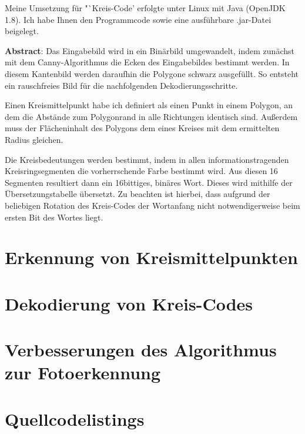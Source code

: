 \documentclass[a4paper, DIV=12, firstfoot=false, dvipsnames]{scrreprt}
\newcommand{\task}[1]{Kreis-Code}
\begin{document}
	\titlehead{Teilnahme 6745 (Team 00001) \hfill Laurenz Grote}
	\title{\task}
	\subtitle{Aufgabe 3}
	\author{Laurenz Friedrich Grote}
	\date{}
	\maketitle
	\tableofcontents
	\vspace {2em}
	Meine Umsetzung für "`\task"' erfolgte unter Linux mit Java (OpenJDK 1.8). Ich habe Ihnen den Programmcode sowie eine ausführbare .jar-Datei beigelegt.
	
	\vfill{}
	\textbf{Abstract}:
	Das Eingabebild wird in ein Binärbild umgewandelt, indem zunächst mit dem Canny-Algorithmus die Ecken des Eingabebildes bestimmt werden. In diesem Kantenbild werden daraufhin die Polygone schwarz ausgefüllt. So entsteht ein rauschfreies Bild für die nachfolgenden Dekodierungsschritte.

	Einen Kreismittelpunkt habe ich definiert als einen Punkt in einem Polygon, an dem die Abstände zum Polygonrand in alle Richtungen identisch sind. Außerdem muss der Flächeninhalt des Polygons dem eines Kreises mit dem ermittelten Radius gleichen.

	Die Kreisbedeutungen werden bestimmt, indem in allen informationstragenden Kreisringsegmenten die vorherrschende Farbe bestimmt wird. Aus diesen 16 Segmenten resultiert dann ein 16bittiges, binäres Wort. Dieses wird mithilfe der Übersetzungstabelle übersetzt. Zu beachten ist hierbei, dass aufgrund der beliebigen Rotation des \task{}s der Wortanfang nicht notwendigerweise beim ersten Bit des Wortes liegt.

	\pagebreak
	\chapter{Erkennung von Kreismittelpunkten}
		
	\chapter{Dekodierung von Kreis-Codes}
		
	\chapter{Verbesserungen des Algorithmus zur Fotoerkennung}
		
	\chapter{Quellcodelistings}
		
\end{document}
